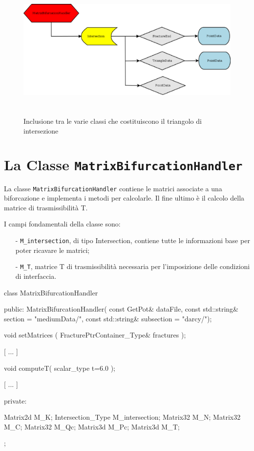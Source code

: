 \newpage
\begin{figure}[htbp]
\centering
\includegraphics[height=7cm, width=1\textwidth]{img/subcap3_3/MatrixBifurcationHandler2.eps}
\caption{Inclusione tra le varie classi che costituiscono il triangolo di intersezione}\label{Inclusione classi MatrixBifurcationHandler}
\end{figure}

\section{La Classe \texttt{MatrixBifurcationHandler}}
La classe \texttt{MatrixBifurcationHandler} contiene le matrici associate a una biforcazione e implementa i metodi per calcolarle.  Il fine ultimo è il calcolo della matrice di trasmissibilità T.

\noindent I campi fondamentali della classe sono:
	\begin{enumerate}
	\item[-] \texttt{M\_intersection}, di tipo Intersection, contiene tutte le informazioni base per poter ricavare le matrici;
	\item[-] \texttt{M\_T}, matrice T di trasmissibilità necessaria per l'imposizione delle condizioni di interfaccia.
	\end{enumerate} 
\begin{Code03_03}[caption={Classe \texttt{MatrixBifurcationHandler}}]
class MatrixBifurcationHandler
{
 public:
	MatrixBifurcationHandler( const GetPot& dataFile,
				const std::string& section = "mediumData/",
				const std::string& subsection = "darcy/");
	
	void setMatrices ( FracturePtrContainer_Type& fractures );
	
	[ ... ]
	
	void computeT( scalar_type t=6.0 );

	[ ... ]

 private:

	Matrix2d M_K;
	Intersection_Type M_intersection;
	Matrix32 M_N;
	Matrix32 M_C;
	Matrix32 M_Qc;
	Matrix3d M_Pc;
	Matrix3d M_T;
};
\end{Code03_03}

